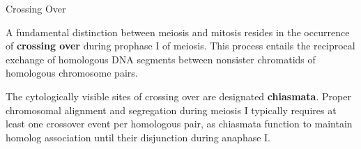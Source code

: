 \documentclass[10pt]{article}
\begin{document}
    \begin{core}[label=core:crossing_over]{Crossing Over}

      A fundamental distinction between meiosis and mitosis resides in the occurrence of \textbf{crossing over} during prophase I of meiosis. This process entails the reciprocal exchange of homologous DNA segments between nonsister chromatids of homologous chromosome pairs.


      The cytologically visible sites of crossing over are designated \textbf{chiasmata}. Proper chromosomal alignment and segregation during meiosis I typically requires at least one crossover event per homologous pair, as chiasmata function to maintain homolog association until their disjunction during anaphase I.

    \end{core}
\end{document}
